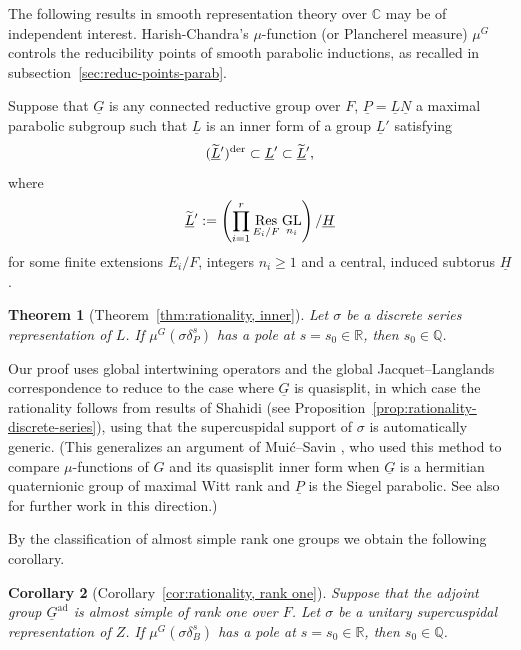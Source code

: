 \documentclass[a4paper]{amsart}
\numberwithin{equation}{section}
\newtheorem{thm}{Theorem}[section]
\newtheorem{cor}[thm]{Corollary}
\theoremstyle{remark}
\theoremstyle{definition}
\DeclareMathOperator{\ad}{ad}
\DeclareMathOperator{\Res}{Res}
\newcommand{\C}{\mathbb{C}}
\newcommand{\Q}{\mathbb{Q}}
\newcommand{\R}{\mathbb{R}}
\DeclareMathOperator{\GL}{GL}
\newcommand{\alggrp}[1]{\underline{#1}}
\newcommand{\der}{\mathrm{der}}
\newcommand{\lowprime}[1][\prime]{
  \mathchoice
    {\raisebox{-0.7ex}{$\scriptstyle #1$}}
    {\raisebox{-0.7ex}{$\scriptstyle #1$}}
    {\raisebox{-0.7ex}{$\scriptstyle #1$}}
    {\raisebox{-0.3ex}{$\scriptscriptstyle #1$}}
}
\begin{document}
The following results in smooth representation theory over $\C$ may be of independent interest.
Harish-Chandra's $\mu$-function (or Plancherel measure) $\mu^G$ controls the reducibility points of smooth parabolic inductions, as recalled in subsection~\ref{sec:reduc-points-parab}.

Suppose that $\alggrp{G}$ is any connected reductive group over $F$, $\alggrp{P} = \alggrp{L}\alggrp{N}$ a maximal parabolic subgroup such that $\alggrp{L}$ is an inner form of a group $\alggrp{L}'$ satisfying 
\[(\widetilde{\alggrp{L}}^{\lowprime})^{\der} \subset \alggrp{L}' \subset \widetilde{\alggrp{L}}^{\lowprime},\]
where 
\[\widetilde{\alggrp{L}}^{\lowprime} := \left(\prod_{i=1}^r \Res_{E_i/F}\GL_{n_i}\right)/\alggrp{H}\]
for some finite extensions $E_i/F$, integers $n_i \ge 1$ and a central, induced subtorus $\alggrp{H}$.

\begin{thm}[Theorem~\ref{thm:rationality, inner}]\label{thm:rationality, inner-intro}
Let $\sigma$ be a discrete series representation of $L$.
If $\mu^G(\sigma\delta_{P}^{s})$ has a pole at $s = s_{0}\in \R$, then $s_{0}\in \Q$.
\end{thm}

Our proof uses global intertwining operators and the global Jacquet--Langlands correspondence \cite{MR2390289} to reduce to the case where $\alggrp G$ is quasisplit,
in which case the rationality follows from results of Shahidi \cite{MR1070599} (see Proposition~\ref{prop:rationality-discrete-series}), using that the supercuspidal support of $\sigma$ is automatically generic.
(This generalizes an argument of Mui\'c--Savin \cite{MR1749954}, who used this method to compare $\mu$-functions of $G$ and its quasisplit inner form when $\alggrp G$ is a hermitian quaternionic group of maximal Witt rank and $\alggrp P$ is the Siegel parabolic.
See also \cite{MR3194161} for further work in this direction.)

By the classification of almost simple rank one groups we obtain the following corollary.

\begin{cor}[Corollary~\ref{cor:rationality, rank one}]\label{cor:rationality, rank one-intro}
  Suppose that the adjoint group $\alggrp{G}^{\ad}$ is almost simple of rank one over $F$.
  Let $\sigma$ be a unitary supercuspidal representation of $Z$.
  If $\mu^G(\sigma\delta_{B}^{s})$ has a pole at $s = s_{0}\in \R$, then $s_{0}\in \Q$.
\end{cor}
\end{document}
